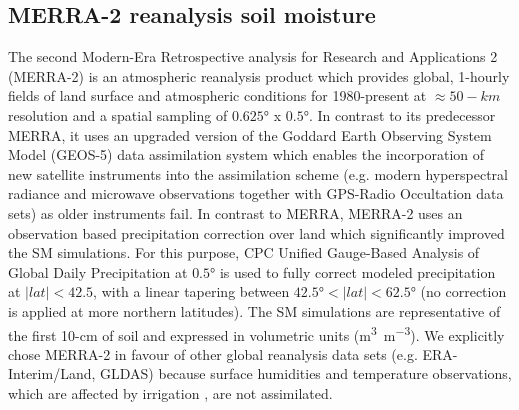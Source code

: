 \documentclass[hess, manuscript]{copernicus}
\begin{document}
\subsection{MERRA-2 reanalysis soil moisture}
The second Modern-Era Retrospective analysis for Research and Applications 2
(MERRA-2) \citep{bosilovich2015merra} is an atmospheric reanalysis product which provides global, 1-hourly fields of land surface and atmospheric conditions for 1980-present at $\approx 50-km$ resolution and a spatial sampling of $0.625 \si{\degree}$ x $0.5 \si{\degree}$. In contrast to its predecessor MERRA, it uses an upgraded version of the Goddard Earth Observing System Model (GEOS-5) data assimilation system which enables the incorporation of new satellite instruments into the assimilation scheme (e.g. modern hyperspectral radiance and microwave observations together with GPS-Radio Occultation data sets) as older instruments fail. In contrast to MERRA, MERRA-2 uses an observation based precipitation correction over land which significantly improved the SM simulations. For this purpose, CPC Unified Gauge-Based Analysis of Global Daily Precipitation \citep{Xie2010} at $0.5\si{\degree}$ is used to fully correct modeled precipitation at $|lat|<42.5$, with a linear tapering between $42.5° < |lat| < 62.5°$ (no correction is applied at more northern latitudes). The SM simulations are representative of the first 10-cm of soil and expressed in volumetric units (\si{\m^{3}.\m^{-3}}). We explicitly chose MERRA-2 in favour of other global reanalysis data sets (e.g. ERA-Interim/Land, GLDAS) because surface humidities and temperature observations, which are affected by irrigation \citep{Wei_2013, Tuinenburg2017}, are not assimilated. 
\end{document}
